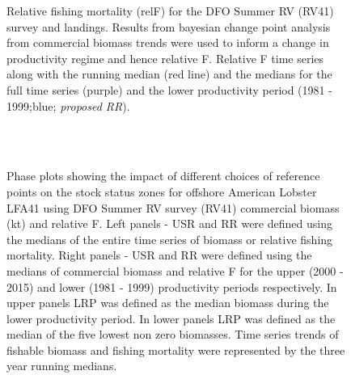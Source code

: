 \documentclass[11pt]{article}
\newcommand{\e}{/backup/bio_data/bio.lobster/figures/} %
\begin{document}
\begin{figure}
\centering
       \caption{Relative fishing mortality (relF) for the DFO Summer RV (RV41) survey and landings. Results from bayesian change point analysis from commercial biomass trends were used to inform a change in productivity regime and hence relative F. Relative F time series along with the running median (red line) and the medians for the full time series (purple) and the lower productivity period (1981 - 1999;blue; \emph{proposed RR}). }
\end{figure}
     \clearpage


\begin{landscape}
\begin{figure}
\centering
        \\
        \\
       
       \caption{Phase plots showing the impact of different choices of reference points on the stock status zones for offshore American Lobster LFA41 using DFO Summer RV survey (RV41) commercial biomass (kt) and relative F. Left panels  - USR and RR were defined using the medians of the entire time series of biomass or relative fishing mortality. Right panels - USR and RR were defined using the medians of commercial biomass and relative F for the upper (2000 - 2015) and lower (1981 - 1999) productivity periods respectively. In upper panels LRP was defined as the median biomass during the lower productivity period. In lower panels LRP was defined as the median of the five lowest non zero biomasses. Time series trends of fishable biomass and fishing mortality were represented by the three year running medians. }

\end{figure}
\end{landscape}

\end{document}
